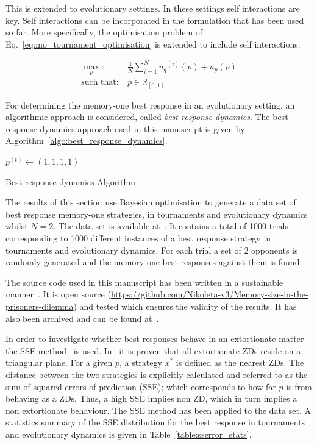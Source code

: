 \documentclass[9pt,twocolumn,twoside,lineno]{pnas-new}
\newcommand{\R}{\mathbb{R}}
\begin{document}
This is extended to evolutionary settings. In these settings
self interactions are key. Self interactions can be incorporated in the
formulation that has been used so far. More specifically, the optimisation
problem of Eq.~\ref{eq:mo_tournament_optimisation} is extended to include self
interactions:

\begin{equation}\label{eq:mo_evolutionary_optimisation}
\begin{aligned}
\max_p: & \ \frac{1}{N} \sum\limits_{i=1} ^ {N} {u_q}^{(i)} (p) + u_p(p)
\\
\text{such that}: & \ p \in \R_{[0, 1]}
\end{aligned}
\end{equation}

For determining the memory-one best response in an evolutionary setting, an
algorithmic approach is considered, called \textit{best response dynamics}. The
best response dynamics approach used in this manuscript is given by
Algorithm~\ref{algo:best_response_dynamics}.

\begin{algorithm}
       $p^{(t)}\leftarrow (1, 1, 1, 1)$\;
       \caption{Best response dynamics Algorithm}
       \label{algo:best_response_dynamics}
\end{algorithm}

The results of this section use Bayesian optimisation to generate a data set of best response
memory-one strategies, in tournaments and evolutionary dynamics whilst \(N=2\).
The data set is available at~\cite{glynatsi2019}. It contains a total of 1000 trials
corresponding to 1000 different instances of a best response strategy in
tournaments and evolutionary dynamics. For each trial a set of 2 opponents is
randomly generated and the memory-one best responses against them is found.

The source code used in this manuscript has been written in a sustainable manner~\cite{Benureau2018}.
It is open source (\url{https://github.com/Nikoleta-v3/Memory-size-in-the-prisoners-dilemma})
and tested which ensures the validity of the results. It has also been archived
and can be found at~\cite{nikoleta_glynatsi_2019}.

In order to investigate whether best responses
behave in an extortionate matter the SSE method~\cite{Knight2019} is used.
In~\cite{Knight2019} it is proven that
all extortionate ZDs reside on a triangular plane. For a given \(p\), a strategy
\(x^*\) is defined as the nearest ZDs. The distance between
the two strategies is explicitly calculated and referred to as the sum of squared
errors of prediction (SSE); which corresponds to how far \(p\) is from behaving as a ZDs.
Thus, a high SSE implies non ZD, which in turn implies a non extortionate behaviour.
The SSE method has been applied to the data set.
A statistics summary
of the SSE distribution for the best response in tournaments and evolutionary dynamics is
given in Table~\ref{table:sserror_stats}.
\end{document}
